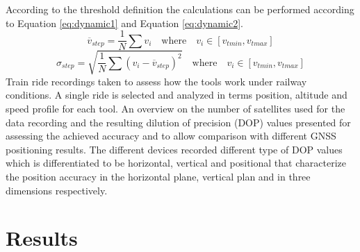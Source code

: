 \documentclass{article}
\begin{document}
			According to the threshold definition the calculations can be performed according to Equation \ref{eq:dynamic1} and Equation \ref{eq:dynamic2}. \\
			\begin{equation} \label{eq:dynamic1}
				\overline{v}_{step}=\frac{1}{N}\sum v_i \quad \textrm{where} \quad v_i \in [v_{tmin}, v_{tmax}]
			\end{equation}
			\begin{equation} \label{eq:dynamic2}
				\sigma_{step}=\sqrt{\frac{1}{N}\sum (v_i-\overline{v}_{step})^2} \quad \textrm{where} \quad v_i \in [v_{tmin}, v_{tmax}]
			\end{equation}
			Train ride recordings taken to assess how the tools work under railway conditions. A single ride is selected and analyzed in terms position, altitude and speed profile for each tool.
			An overview on the number of satellites used for the data recording and the resulting dilution of precision (DOP) values presented for assessing the achieved accuracy and to allow comparison with different GNSS positioning results. The different devices recorded different type of DOP values which is differentiated to be horizontal, vertical and positional that characterize the position accuracy in the horizontal plane, vertical plan and in three dimensions respectively.
	\section{Results}
\end{document}
